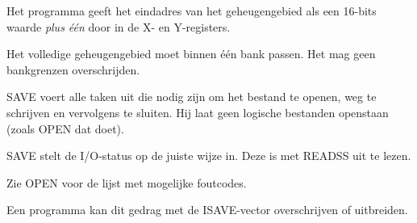 \begin{description}[leftmargin=2cm,style=nextline]
        Het programma geeft het eindadres van het geheugengebied als een 16-bits waarde \emph{plus één} door in de X- en Y-registers.

        Het volledige geheugengebied moet binnen één bank passen. Het mag geen bankgrenzen overschrijden.

        SAVE voert alle taken uit die nodig zijn om het bestand te openen, weg te schrijven en vervolgens te sluiten. Hij laat geen logische bestanden openstaan (zoals OPEN dat doet).

        SAVE stelt de I/O-status op de juiste wijze in. Deze is met READSS uit te lezen.

        Zie OPEN voor de lijst met mogelijke foutcodes.

        Een programma kan dit gedrag met de ISAVE-vector overschrijven of uitbreiden.    \item [Voorbeeld:]
\end{description}


\newpage
